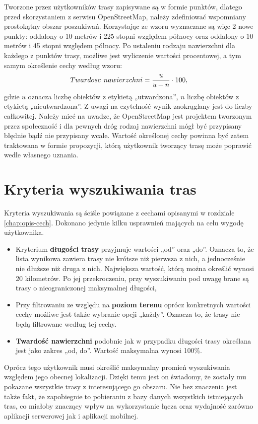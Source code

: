 Tworzone przez użytkowników trasy zapisywane są w formie punktów, dlatego przed skorzystaniem z serwisu OpenStreetMap, należy zdefiniować wspomniany prostokątny obszar poszukiwań. Korzystając ze wzoru \cite{eq:haversine_generowanie_punktu} wyznaczane są więc 2 nowe punkty: oddalony o 10 metrów i 225 stopni względem północy oraz oddalony o 10 metrów i 45 stopni względem północy. Po ustaleniu rodzaju nawierzchni dla każdego z punktów trasy, możliwe jest wyliczenie wartości procentowej, a tym samym określenie cechy według wzoru:
\begin{equation}\label{eq:haversine1}
{Twardosc\hspace{0.15cm} nawierzchni} = \frac{u}{u + n} \cdot 100,
\end{equation}
gdzie \(u\) oznacza liczbę obiektów z etykietą  „utwardzona”, \(n\) liczbę obiektów z etykietą  „nieutwardzona”.
Z uwagi na czytelność wynik zaokrąglany jest do liczby całkowitej.
Należy mieć na uwadze, że OpenStreetMap jest projektem tworzonym przez społeczność i dla pewnych dróg rodzaj nawierzchni mógł być przypisany błędnie bądź nie przypisany wcale. Wartość określonej cechy powinna być zatem traktowana w formie propozycji, którą użytkownik tworzący trasę może poprawić wedle własnego uznania.

\section{Kryteria wyszukiwania tras}\label{chap:kryteria}
Kryteria wyszukiwania są ściśle powiązane z cechami opisanymi w rozdziale \ref{chap:opis-cech}. Dokonano jedynie kilku usprawnień mających na celu wygodę użytkownika.
\begin{itemize}
\item{Kryterium \textbf{długości trasy} przyjmuje wartości „od” oraz „do”. Oznacza to, że lista wynikowa zawiera trasy nie krótsze niż pierwsza z nich, a jednocześnie nie dłuższe niż druga z nich. Największa wartość, którą można określić wynosi 20 kilometrów.  Po jej przekroczeniu, przy wyszukiwaniu pod uwagę brane są trasy o nieograniczonej maksymalnej długości,}
\item{Przy filtrowaniu ze względu na \textbf{poziom terenu} oprócz konkretnych wartości cechy możliwe jest także wybranie opcji „każdy”. Oznacza to, że trasy nie będą filtrowane według tej cechy.}
\item{\textbf{Twardość nawierzchni} podobnie jak w przypadku długości trasy określana jest jako zakres  „od, do”. Wartość maksymalna wynosi 100\%.}
\end{itemize}
Oprócz tego użytkownik musi określić maksymalny promień wyszukiwania względem jego obecnej lokalizacji. Dzięki temu jest on świadomy, że zostały mu pokazane wszystkie trasy z interesującego go obszaru. Nie bez znaczenia jest także fakt, że zapobiegnie to pobieraniu z bazy danych wszystkich istniejących tras, co miałoby znaczący wpływ na wykorzystanie łącza oraz wydajność zarówno aplikacji serwerowej jak i aplikacji mobilnej.